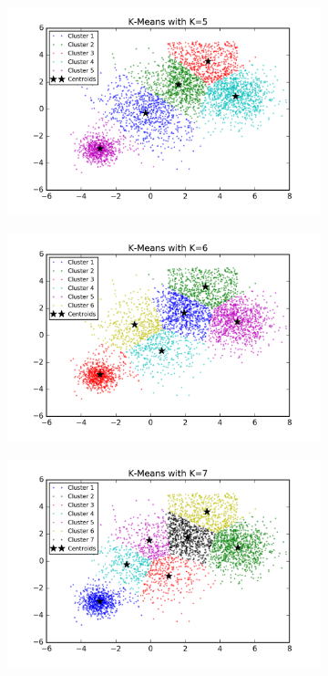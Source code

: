 \begin{description}
\begin{figure}[htb]
\begin{subfigure}[b]{0.475\textwidth}
            \includegraphics[width=\textwidth]{./figures/bigClustering_kMeans_5.png}
        \end{subfigure}
        \hfill
        \begin{subfigure}[b]{0.475\textwidth}   
            \centering 
            \includegraphics[width=\textwidth]{./figures/bigClustering_kMeans_6.png}
        \end{subfigure}
        \begin{subfigure}[b]{0.475\textwidth}   
            \centering 
            \includegraphics[width=\textwidth]{./figures/bigClustering_kMeans_7.png}

\end{subfigure}
\end{figure}
\end{description}
